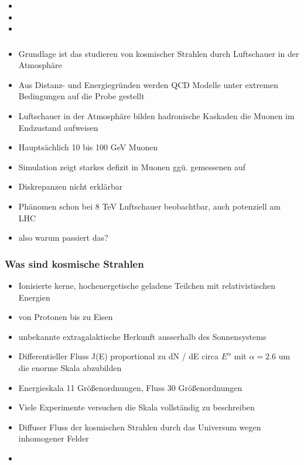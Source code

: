 \documentclass[aspectratio=1610, 9pt]{beamer}
\begin{document}
\begin{frame}\frametitle{}
  \begin{itemize}
    \item
    \item
    \item
  \end{itemize}
\end{frame}

\begin{frame}\frametitle{}
  \begin{itemize}
    \item Grundlage ist das studieren von kosmischer Strahlen durch Luftschauer
    in der Atmosphäre
    \item Aus Distanz- und Energiegr\"unden werden QCD Modelle unter extremen
    Bedingungen auf die Probe gestellt
    \item Luftschauer in der Atmosphäre bilden hadronische Kaskaden die Muonen
    im Endzustand aufweisen
    \item Hauptsächlich 10 bis 100 GeV Muonen
    \item Simulation zeigt starkes defizit in Muonen gg\"u. gemessenen auf
    \item Diskrepanzen nicht erklärbar
    \item Phänomen schon bei 8 TeV Luftschauer beobachtbar, auch potenziell am LHC
    \item also warum passiert das?
  \end{itemize}
\end{frame}

\begin{frame}\frametitle{Was sind kosmische Strahlen}
  \begin{itemize}
    \item Ionisierte kerne, hochenergetische geladene Teilchen mit relativistischen
    Energien
    \item von Protonen bis zu Eisen
    \item unbekannte extragalaktische Herkunft ausserhalb des Sonnensystems
    \item Differentieller Fluss J(E) proportional zu dN / dE circa $E^\alpha$
    mit $\alpha = 2.6$ um die enorme Skala abzubilden
    \item Energieskala 11 Größenordnungen, Fluss 30 Größenordnungen
    \item Viele Experimente versuchen die Skala vollständig zu beschreiben
    \item Diffuser Fluss der kosmischen Strahlen durch das Universum wegen
    inhomogener Felder
    \item
  \end{itemize}
\end{frame}
\end{document}
